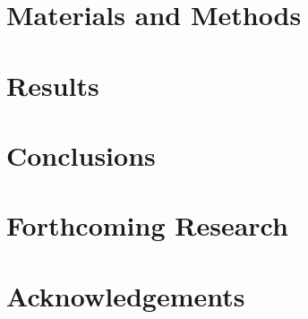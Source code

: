 \documentclass[a0,portrait]{a0poster}
\begin{document}
\begin{multicols}{2}
	\section*{Materials and Methods}


	\section*{Results}



	\color{DarkRed} %

	\section*{Conclusions}


	\color{DarkSlateGray} %


	\section*{Forthcoming Research}


	\nocite{*} %


	\section*{Acknowledgements}

	
\end{multicols}
\end{document}
